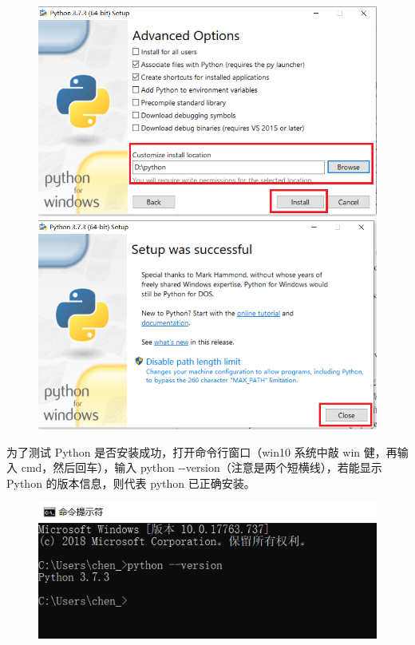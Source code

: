 \clearpage
\begin{figure}[ht]
  \centering
  \includegraphics[scale=0.4]{figure/chapter1/pythonDownload5.png}\quad
  \includegraphics[scale=0.4]{figure/chapter1/pythonDownload6.png}
\end{figure}

为了测试 Python 是否安装成功，打开命令行窗口（win10 系统中敲 win 健，再输入 cmd，然后回车），输入 python -{}-version（注意是两个短横线），若能显示 Python 的版本信息，则代表 python 已正确安装。

\begin{figure}[!ht]
  \centering
  \includegraphics[scale=0.7]{figure/chapter1/pythonDownload3.png}
\end{figure}

